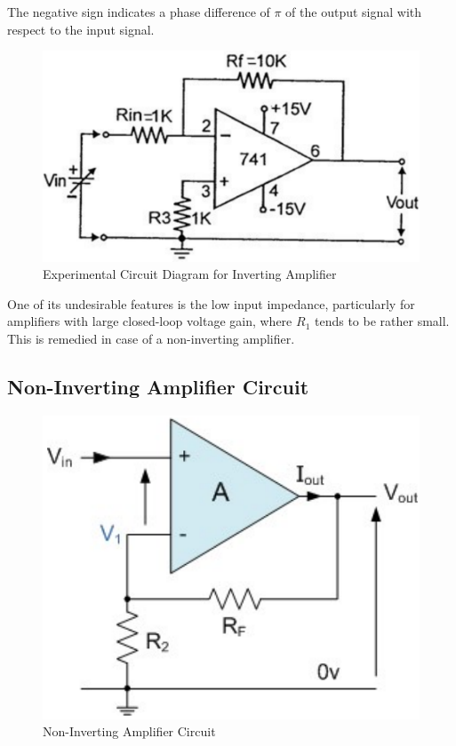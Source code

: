 The negative sign indicates a phase difference of $\pi$ of the output signal with respect to the input signal.

\begin{figure}[H]
    \centering
    \includegraphics[width=0.8\columnwidth]{images/inv3.png}
    \caption{Experimental Circuit Diagram for Inverting Amplifier}
    \label{inv3}
\end{figure}

One of its undesirable features is the low input impedance, particularly for amplifiers with large closed-loop voltage gain, where $R_1$ tends to be rather small. This is remedied in case of a non-inverting amplifier. 


\subsection{Non-Inverting Amplifier Circuit}

\begin{figure}[H]
    \centering
    \includegraphics[width=0.6\columnwidth]{images/noninv1.png}
    \caption{Non-Inverting Amplifier Circuit}
    \label{noninv1}
\end{figure}

